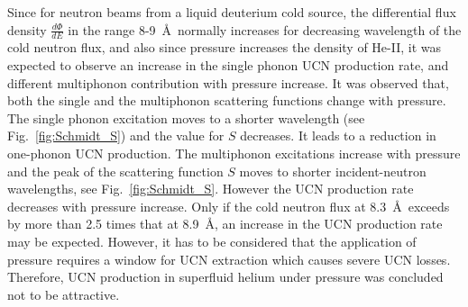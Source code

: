 Since for neutron beams from a liquid deuterium cold source, the
differential flux density $\frac{d\Phi}{dE}$ in the range
8-9~\AA~normally increases for decreasing wavelength of the cold
neutron flux, and also since pressure increases the density of He-II,
it was expected to observe an increase in the single phonon UCN
production rate, and different multiphonon contribution with pressure
increase.  It was observed that, both the single and the multiphonon
scattering functions change with pressure. The single phonon
excitation moves to a shorter wavelength (see
Fig.~\ref{fig:Schmidt_S}) and the value for $S$ decreases. It leads to
a reduction in one-phonon UCN production.  The multiphonon excitations
increase with pressure and the peak of the scattering function $S$
moves to shorter incident-neutron wavelengths, see
Fig.~\ref{fig:Schmidt_S}. However the UCN production rate decreases
with pressure increase.  Only if the cold neutron flux at
8.3~\AA~exceeds by more than 2.5 times that at 8.9~\AA, an increase in
the UCN production rate may be expected. However, it has to be
considered that the application of pressure requires a window for UCN
extraction which causes severe UCN losses. Therefore, UCN production
in superfluid helium under pressure was concluded not to be
attractive.




